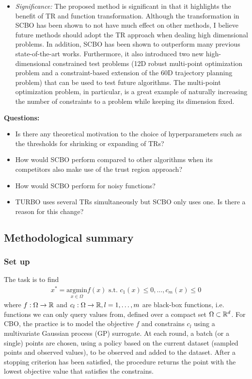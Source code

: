 \begin{itemize}
    \item \textit{Significance:} The proposed method is significant in that it highlights the benefit of TR and function transformation. Although the transformation in SCBO has been shown to not have much effect on other methods, I believe future methods should adopt the TR approach when dealing high dimensional problems. In addition, SCBO has been shown to outperform many previous state-of-the-art works. Furthermore, it also introduced two new high-dimensional constrained test problems (12D robust multi-point optimization problem and a constraint-based extension of the 60D trajectory planning problem) that can be used to test future algorithms. The multi-point optimization problem, in particular, is a great example of naturally increasing the number of constraints to a problem while keeping its dimension fixed.
\end{itemize}
\textbf{Questions:}
\begin{itemize}
    \item Is there any theoretical motivation to the choice of hyperparameters such as the thresholds for shrinking or expanding of TRs?
    \item How would SCBO perform compared to other algorithms when its competitors also make use of the trust region approach?
    \item How would SCBO perform for noisy functions?
    \item TURBO uses several TRs simultaneously but SCBO only uses one. Is there a reason for this change?
\end{itemize}

\subsection{Methodological summary}
\subsubsection{Set up}
The task is to find
\begin{align}
    x^*=\underset{x\in \Omega}{\text{argmin}}f(x)\text{ s.t. }c_1(x)\le0,\ldots,c_m(x)\le0
\end{align}
where $f:\Omega\to\mathbb{R}$ and $c_l:\Omega\to\mathbb{R},l=1,\ldots,m$ are black-box functions, i.e. functions we can only query values from, defined over a compact set $\Omega\subset \mathbb{R}^d$. For CBO, the practice is to model the objective $f$ and constrains $c_l$ using a multivariate Gaussian process (GP) surrogate. At each round, a batch (or a single) points are chosen, using a policy based on the current dataset (sampled points and observed values), to be observed and added to the dataset. After a stopping criterion has been satisfied, the procedure returns the point with the lowest objective value that satisfies the constrains.

